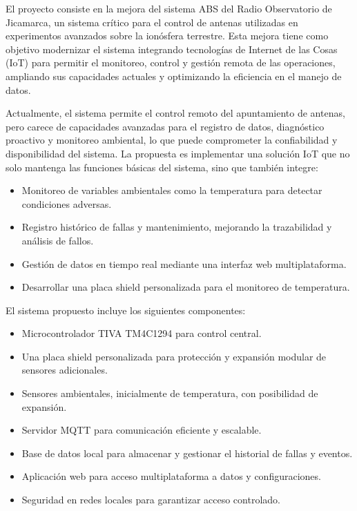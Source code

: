 \documentclass[
11pt, %
]{charter}
\begin{document}
El proyecto consiste en la mejora del sistema ABS del Radio Observatorio de Jicamarca, un sistema crítico para el control de antenas utilizadas en experimentos avanzados sobre la ionósfera terrestre. Esta mejora tiene como objetivo modernizar el sistema integrando tecnologías de Internet de las Cosas (IoT) para permitir el monitoreo, control y gestión remota de las operaciones, ampliando sus capacidades actuales y optimizando la eficiencia en el manejo de datos.

Actualmente, el sistema permite el control remoto del apuntamiento de antenas, pero carece de capacidades avanzadas para el registro de datos, diagnóstico proactivo y monitoreo ambiental, lo que puede comprometer la confiabilidad y disponibilidad del sistema. La propuesta es implementar una solución IoT que no solo mantenga las funciones básicas del sistema, sino que también integre:

\begin{itemize}
	\item Monitoreo de variables ambientales como la temperatura para detectar condiciones adversas.
	\item Registro histórico de fallas y mantenimiento, mejorando la trazabilidad y análisis de fallos.
	\item Gestión de datos en tiempo real mediante una interfaz web multiplataforma.
	\item Desarrollar una placa shield personalizada para el monitoreo de temperatura.
\end{itemize}

El sistema propuesto incluye los siguientes componentes:
\begin{itemize}
    \item Microcontrolador TIVA TM4C1294 para control central.

	\item Una placa shield personalizada para protección y expansión modular de sensores adicionales.

	\item Sensores ambientales, inicialmente de temperatura, con posibilidad de expansión.

	\item Servidor MQTT para comunicación eficiente y escalable.

	\item Base de datos local para almacenar y gestionar el historial de fallas y eventos.

	\item Aplicación web para acceso multiplataforma a datos y configuraciones.

	\item Seguridad en redes locales para garantizar acceso controlado.	
\end{itemize}
\end{document}
